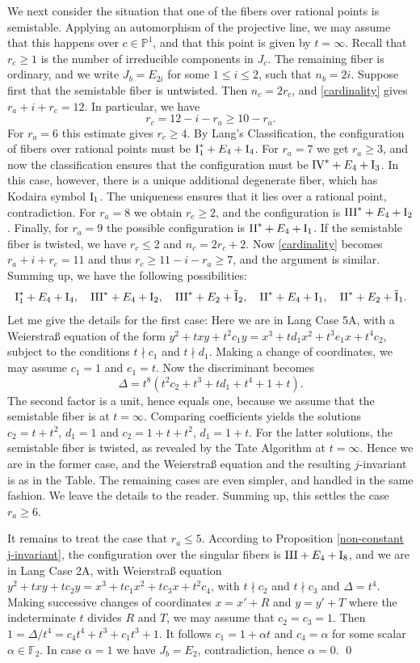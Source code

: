 \documentclass[oneside, 12pt]{amsart}
\theoremstyle{definition}
\theoremstyle{remark}
\newcommand{\FF}{\mathbb{F}}
\newcommand{\PP}{\mathbb{P}}
\newcommand{\I}{\text{\rm I}}
\newcommand{\II}{\text{\rm II}}
\newcommand{\III}{\text{\rm III}}
\newcommand{\IV}{\text{\rm IV}}
\newcommand{\tI}{\text{\rm \~{I}}}
\begin{document}
We next consider the situation that one of the fibers over rational points is semistable.
Applying an automorphism of the projective line, we may assume that this happens over $c\in\PP^1$,
and that this point is given by $t=\infty$. Recall that $r_c\geq 1$ is the number of irreducible components
in $J_c$. The remaining fiber is ordinary,
and we write $J_b=E_{2i}$ for some $1\leq i\leq 2$, such that $n_b=2i$.
Suppose first that the semistable fiber is untwisted.
Then $n_c=2r_c$, and \eqref{cardinality} gives $r_a+i+r_c=12$. In particular, we have
$$
r_c = 12-i-r_a\geq 10-r_a.
$$
For $r_a=6$ this estimate gives $r_c\geq 4$. By Lang's Classification, the configuration of fibers over rational points
must be $\I_1^*+E_4+\I_4$. For $r_a=7$ we get  $r_a\geq 3$, and now the classification ensures that the configuration must be $\IV^*+E_4+\I_3$.
In this case, however, there is a unique additional degenerate fiber, which has Kodaira symbol $\I_1$.
The uniqueness ensures that it lies over a rational point, contradiction.
For $r_a=8$ we obtain $r_c\geq 2$, and the configuration is $\III^*+E_4+\I_2$.
Finally, for $r_a=9$ the possible configuration is $\II^*+E_4+\I_1$.
If the semistable fiber is twisted, we have  $r_c\leq 2$ and $n_c=2r_c+2$.
Now \eqref{cardinality} becomes $r_a+i+r_c=11$ and thus $r_c\geq 11-i-r_a\geq 7$, and the argument is similar.
Summing up, we have the following possibilities:
$$
\I_1^*+E_4+\I_4,\quad \III^*+E_4+\I_2,\quad\III^*+E_2+\tI_2, \quad \II^*+E_4+\I_1,\quad \II^*+E_2+\tI_1.
$$
Let me give the details for the first case: Here we are in Lang Case 5A,
with a Weierstra\ss{} equation of the form $y^2+txy+t^2c_1y=x^3+td_1x^2+t^3e_1x+t^4c_2$,
subject to the conditions  $t\nmid c_1$ and $t\nmid d_1$.
Making a change of coordinates, we may assume $c_1=1$ and $e_1=t$.
Now the discriminant becomes
$$
\Delta=t^8(t^2c_2+t^3+td_1+t^4+1+t).
$$
The second factor is a unit, hence equals one, because we assume that the semistable fiber is at $t=\infty$.
Comparing coefficients yields the solutions  $c_2=t+t^2$, $d_1=1$ and $c_2=1+t+t^2$, $d_1=1+t$.
For the latter solutions, the semistable fiber is twisted, as revealed by the Tate Algorithm at $t=\infty$.
Hence we are in the former case, and the Weierstra\ss{} equation and the resulting $j$-invariant is as in the Table.
The remaining cases are even simpler, and handled in the same fashion. We leave the details to the reader.
Summing up, this settles the case $r_a\geq 6$.

It remains to treat the case that $r_a\leq 5$. According to Proposition \ref{non-constant j-invariant}, the configuration over
the singular fibers is $\III+E_4+\I_8$, and we are in Lang Case 2A, with Weierstra\ss{} equation
$y^2+txy + tc_2y=x^3+tc_1x^2+tc_3x+t^2c_4$, with $t\nmid c_2$ and $t\nmid c_3$ and $\Delta=t^4$.
Making successive changes  of coordinates  $x=x'+R$ and $y=y'+T$ 
where the indeterminate $t$ divides $R$ and $T$, 
we may assume that $c_2=c_3=1$.
Then $1=\Delta/t^4=c_4t^4+t^3+c_1t^3+1$. It follows $c_1=1+\alpha t$ and $c_4=\alpha$
for some scalar $\alpha\in \FF_2$. In case $\alpha=1$ we have $J_b=E_2$, contradiction, hence $\alpha=0$.
\qed
\end{document}
